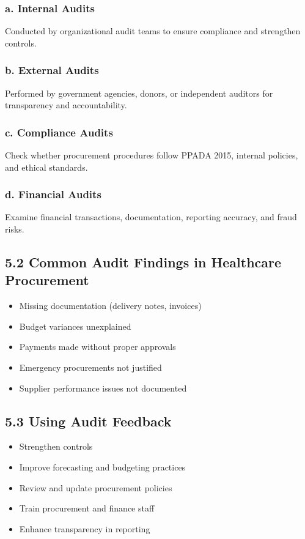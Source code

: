 \documentclass[10pt]{article}
\begin{document}
\subsubsection*{a. Internal Audits}
Conducted by organizational audit teams to ensure compliance and strengthen controls.

\subsubsection*{b. External Audits}
Performed by government agencies, donors, or independent auditors for transparency and accountability.

\subsubsection*{c. Compliance Audits}
Check whether procurement procedures follow PPADA 2015, internal policies, and ethical standards.

\subsubsection*{d. Financial Audits}
Examine financial transactions, documentation, reporting accuracy, and fraud risks.

\subsection*{5.2 Common Audit Findings in Healthcare Procurement}
\begin{itemize}
  \item Missing documentation (delivery notes, invoices)
  \item Budget variances unexplained
  \item Payments made without proper approvals
  \item Emergency procurements not justified
  \item Supplier performance issues not documented
\end{itemize}

\subsection*{5.3 Using Audit Feedback}
\begin{itemize}
  \item Strengthen controls
  \item Improve forecasting and budgeting practices
  \item Review and update procurement policies
  \item Train procurement and finance staff
  \item Enhance transparency in reporting
\end{itemize}
\end{document}
